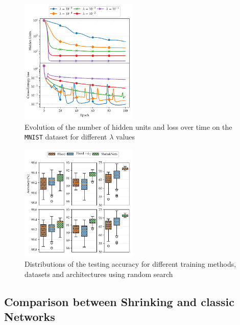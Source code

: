 \documentclass[sigconf]{acmart}
\begin{document}
\begin{figure}
\begin{center}
\includegraphics[width=0.5\textwidth]{convergence}
\caption{Evolution of the number of hidden units and loss over time on the \texttt{MNIST} dataset for different $\lambda$ values \label{convergence_plot}}
\end{center}
\end{figure}

\begin{figure}
\begin{center}
  \includegraphics[width=0.5\textwidth]{hyper_opt}
\caption{Distributions of the testing accuracy for different training methods, datasets and architectures using random search\label{hyper_opt_res}}
\end{center}
\end{figure}

\subsection{Comparison between Shrinking and classic Networks}
\end{document}
